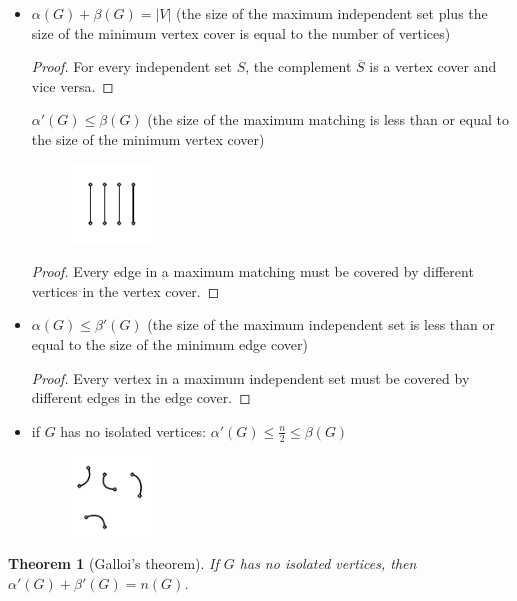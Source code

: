 \documentclass[notitlepage, 12pt]{article}
\newtheorem*{theorem}{Theorem}
\begin{document}
\begin{itemize}
  \item $\alpha(G) + \beta(G) = |V|$ (the size of the maximum independent set plus the size of the minimum vertex cover is equal to the number of vertices)
  \begin{proof}
    For every independent set $S$, the complement $\overline{S}$ is a vertex cover and vice versa.
  \end{proof}
  $\alpha'(G) \leq \beta(G)$ (the size of the maximum matching is less than or equal to the size of the minimum vertex cover)
  \begin{figure}[h]
    \includegraphics[width=0.2\textwidth]{matching-number-smaller-than-vertex-cover.pdf}
    \centering
  \end{figure}
  \begin{proof}
    Every edge in a maximum matching must be covered by different vertices in the vertex cover.
  \end{proof}
  \item $\alpha(G) \leq \beta'(G)$ (the size of the maximum independent set is less than or equal to the size of the minimum edge cover)
  \begin{proof}
    Every vertex in a maximum independent set must be covered by different edges in the edge cover.
  \end{proof}
  \item if $G$ has no isolated vertices: $\alpha'(G) \leq \frac{n}{2} \leq \beta(G)$
  \begin{figure}[h]
    \includegraphics[width=0.2\textwidth]{matching-number-smaller-than-vertex-cover-2.pdf}
    \centering
  \end{figure}
\end{itemize}
\newpage
\begin{theorem}[Galloi's theorem]\label{gallois-theorem}
  If $G$ has no isolated vertices, then $\alpha'(G) + \beta'(G) = n(G)$.
\end{theorem}
\end{document}

